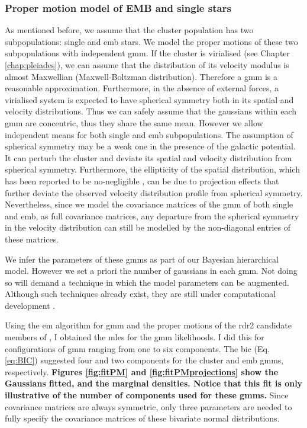 \subsubsection{Proper motion model of EMB and single stars}
\label{sect:cluster_pm}
As mentioned before, we assume that the cluster population has two subpopulations: single and \gls{emb} stars.
We model the proper motions of these two subpopulations with independent \gls{gmm}. If the cluster is virialised (see Chapter \ref{chap:pleiades}), we can assume that{ the distribution of its velocity modulus} is almost Maxwellian (Maxwell-Boltzman distribution). Therefore a \gls{gmm} is a reasonable {approximation}. Furthermore, in the absence of external forces, a virialised system is expected to have spherical symmetry both in its spatial and velocity distributions. Thus we can safely assume that the gaussians within each \gls{gmm} are concentric, thus they share the same mean. However we allow independent means for both single and \gls{emb} subpopulations. The assumption of spherical symmetry may be a weak one in the presence of the galactic potential. It can perturb the cluster and deviate its spatial and velocity distribution from spherical symmetry. Furthermore, the ellipticity of the spatial distribution, which has been reported to be no-negligible \cite[$\epsilon=0.17$, according to ][]{Raboud1998}, can be due to projection effects that further deviate the observed velocity distribution profile from spherical symmetry. Nevertheless, since we model the covariance matrices of the \gls{gmm} of both single and \gls{emb}, as full covariance matrices, any departure from the spherical symmetry in the velocity distribution can still be modelled by the non-diagonal entries of these matrices.


We infer the parameters of these \glspl{gmm} as part of our Bayesian hierarchical model. However we set a priori the number of gaussians in each \gls{gmm}. Not doing so will demand a technique in which the model parameters can be augmented. Although such techniques already exist, they are still under computational development \cite[see][for a review of reversible jump \gls{mcmc}]{Fan2011}.

Using the \gls{em} algorithm for \gls{gmm} and the proper motions of the \gls{rdr2} candidate members of \citet{Bouy2015}, I obtained the \glspl{mle} for the \gls{gmm} likelihoods. I did this for configurations of \gls{gmm} ranging from one to six components. The \gls{bic} (Eq. \ref{eq:BIC}) suggested four and two components for the cluster and \gls{emb} \glspl{gmm}, respectively. \textbf{Figures \ref{fig:fitPM} and \ref{fig:fitPMprojections} show the Gaussians fitted, and the marginal densities. Notice that this fit is only illustrative of the number of components used for these \glspl{gmm}. } Since covariance matrices are always symmetric, only three parameters are needed to fully specify the covariance matrices of these bivariate normal distributions.

